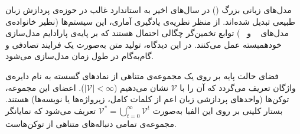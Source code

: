 مدل‌های زبانی بزرگ () در سال‌های اخیر به استاندارد غالب در حوزه‌ی پردازش زبان طبیعی تبدیل شده‌اند. از منظر نظریه‌ی یادگیری آماری، این سیستم‌ها (نظیر خانواده‌ی مدل‌های ~\cite{brown2020language} و ~\cite{touvron2023llama}) توابع تخمین‌گر چگالی احتمال هستند که بر پایه‌ی پارادایم مدل‌سازی خودهمبسته عمل می‌کنند. در این دیدگاه، تولید متن به‌صورت یک فرایند تصادفی و گام‌به‌گام در طول زمان مدل‌سازی می‌شود.

فضای حالت پایه بر روی یک مجموعه‌ی متناهی از نمادهای گسسته به نام دایره‌ی واژگان تعریف می‌گردد که آن را با $\mathcal{V}$ نشان می‌دهیم ($|\mathcal{V}| < \infty$). اعضای این مجموعه، توکن‌ها (واحدهای پردازشی زبان اعم از کلمات کامل، زیرواژه‌ها یا نویسه‌ها) هستند. بستار کلینی بر روی این الفبا به‌صورت $\mathcal{V}^* = \bigcup_{t=0}^\infty \mathcal{V}^t$ تعریف می‌شود که نمایانگر مجموعه‌ی تمامی دنباله‌های متناهی از توکن‌هاست. 


